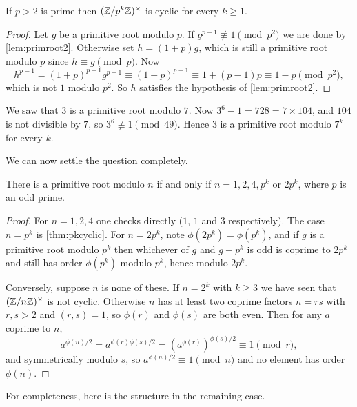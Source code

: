 \documentclass[a4paper]{scrartcl}
\begin{document}
\begin{theorem}\label{thm:pkcyclic}
	If $p > 2$ is prime then $(\mathbb{Z}/p^k\mathbb{Z})^\times$ is cyclic for every $k \geq 1$.
\end{theorem}
\begin{proof}
	Let $g$ be a primitive root modulo $p$. If $g^{p-1} \not\equiv 1 \pmod{p^2}$ we are done by \autoref{lem:primroot2}. Otherwise set $h = (1 + p)g$, which is still a primitive root modulo $p$ since $h \equiv g \pmod p$. Now
	$$
	h^{p-1} = (1+p)^{p-1}g^{p-1} \equiv (1 + p)^{p-1} \equiv 1 + (p-1)p \equiv 1 - p \pmod{p^2},
	$$
	which is not $1$ modulo $p^2$. So $h$ satisfies the hypothesis of \autoref{lem:primroot2}.
\end{proof}

\begin{example}
	We saw that $3$ is a primitive root modulo $7$. Now $3^6 - 1 = 728 = 7 \times 104$, and $104$ is not divisible by $7$, so $3^6 \not\equiv 1 \pmod{49}$. Hence $3$ is a primitive root modulo $7^k$ for every $k$.
\end{example}

We can now settle the question completely.

\begin{theorem}
	There is a primitive root modulo $n$ if and only if $n = 1, 2, 4, p^k$ or $2p^k$, where $p$ is an odd prime.
\end{theorem}
\begin{proof}
	For $n = 1, 2, 4$ one checks directly ($1$, $1$ and $3$ respectively). The case $n = p^k$ is \autoref{thm:pkcyclic}. For $n = 2p^k$, note $\phi(2p^k) = \phi(p^k)$, and if $g$ is a primitive root modulo $p^k$ then whichever of $g$ and $g + p^k$ is odd is coprime to $2p^k$ and still has order $\phi(p^k)$ modulo $p^k$, hence modulo $2p^k$.

	Conversely, suppose $n$ is none of these. If $n = 2^k$ with $k \geq 3$ we have seen that $(\mathbb{Z}/n\mathbb{Z})^\times$ is not cyclic. Otherwise $n$ has at least two coprime factors $n = rs$ with $r, s > 2$ and $(r,s) = 1$, so $\phi(r)$ and $\phi(s)$ are both even. Then for any $a$ coprime to $n$,
	$$
	a^{\phi(n)/2} = a^{\phi(r)\phi(s)/2} = \left(a^{\phi(r)}\right)^{\phi(s)/2} \equiv 1 \pmod r,
	$$
	and symmetrically modulo $s$, so $a^{\phi(n)/2} \equiv 1 \pmod n$ and no element has order $\phi(n)$.
\end{proof}

For completeness, here is the structure in the remaining case.
\end{document}
